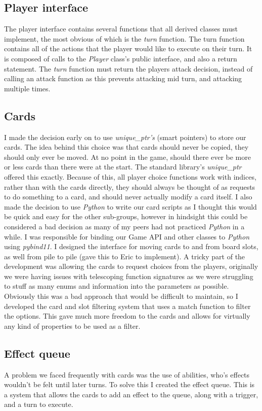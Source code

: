 \documentclass[a4paper]{article}
\begin{document}
\subsection{Player interface}
The player interface contains several functions that all derived classes must implement, the most obvious of which is the \textit{turn} function. The turn function contains all of the actions that the player would like to execute on their turn. It is composed of calls to the \textit{Player} class's public interface, and also a return statement. The \textit{turn} function must return the players attack decision, instead of calling an attack function as this prevents attacking mid turn, and attacking multiple times.

\subsection{Cards}
I made the decision early on to use \textit{unique\_ptr's} (smart pointers) to store our cards. The idea behind this choice was that cards should never be copied, they should only ever be moved. At no point in the game, should there ever be more or less cards than there were at the start. The standard library's \textit{unique\_ptr} offered this exactly. Because of this, all player choice functions work with indices, rather than with the cards directly, they should always be thought of as requests to do something to a card, and should never actually modify a card itself. I also made the decision to use \textit{Python} to write our card scripts as I thought this would be quick and easy for the other sub-groups, however in hindsight this could be considered a bad decision as many of my peers had not practiced \textit{Python} in a while. I was responsible for binding our Game API and other classes to \textit{Python} using \textit{pybind11}. I designed the interface for moving cards to and from board slots, as well from pile to pile (gave this to Eric to implement). A tricky part of the development was allowing the cards to request choices from the players, originally we were having issues with telescoping function signatures as we were struggling to stuff as many enums and information into the parameters as possible. Obviously this was a bad approach that would be difficult to maintain, so I developed the card and slot filtering system that uses a match function to filter the options. This gave much more freedom to the cards and allows for virtually any kind of properties to be used as a filter. 

\subsection{Effect queue}
A problem we faced frequently with cards was the use of abilities, who's effects wouldn't be felt until later turns. To solve this I created the effect queue. This is a system that allows the cards to add an effect to the queue, along with a trigger, and a turn to execute.
\end{document}
